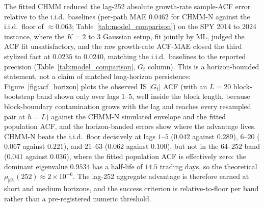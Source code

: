 The fitted CHMM reduced the lag-252 absolute growth-rate sample-ACF error relative to the i.i.d.\ baselines (per-path MAE $0.0462$ for CHMM-N against the i.i.d.\ floor of $\approx 0.063$; Table~\ref{tab:model_comparison}) on the SPY 2014 to 2024 instance, where the \citet{ryden1998stylized} $K = 2$ to $3$ Gaussian setup, fit jointly by ML, judged the ACF fit unsatisfactory, and the raw growth-rate ACF-MAE closed the third stylized fact at $0.0235$ to $0.0240$, matching the i.i.d.\ baselines to the reported precision (Table~\ref{tab:model_comparison}, $G_t$ column). This is a horizon-bounded statement, not a claim of matched long-horizon persistence: Figure~\ref{fig:acf_horizon} plots the observed IS $|G_t|$ ACF (with an $L = 20$ block-bootstrap band shown only over lags $1$--$5$, well inside the block length, because block-boundary contamination grows with the lag and reaches every resampled pair at $h = L$) against the CHMM-N simulated envelope and the fitted population ACF, and the horizon-banded errors show where the advantage lives. CHMM-N beats the i.i.d.\ floor decisively at lags $1$--$5$ ($0.042$ against $0.289$), $6$--$20$ ($0.067$ against $0.221$), and $21$--$63$ ($0.062$ against $0.100$), but not in the $64$--$252$ band ($0.041$ against $0.036$), where the fitted population ACF is effectively zero: the dominant eigenvalue $0.9534$ has a half-life of $14.5$ trading days, so the theoretical $\rho_{|G|}(252) \approx 2 \times 10^{-6}$. The lag-252 aggregate advantage is therefore earned at short and medium horizons, and the success criterion is relative-to-floor per band rather than a pre-registered numeric threshold.

